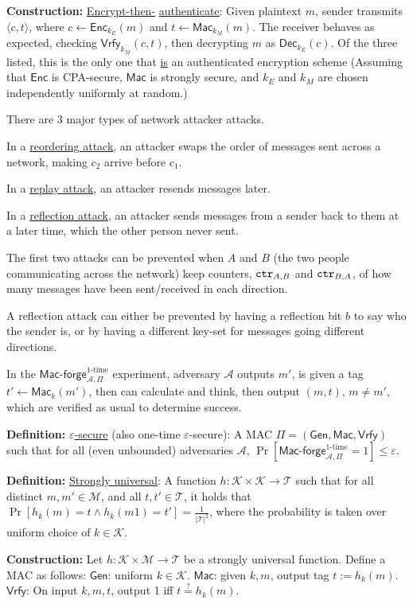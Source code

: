 \documentclass[10pt]{article}
\newcommand{\AAA}{\mathcal{A}}
\newcommand{\KKK}{\mathcal{K}}
\newcommand{\MMM}{\mathcal{M}}
\newcommand{\TTT}{\mathcal{T}}
\newcommand{\defn}[1]{{\bf Definition:} \underline{#1}}
\newcommand{\con}[1]{{\bf Construction:} \underline{#1}}
\newcommand{\Enc}{\mathsf{Enc}}
\newcommand{\Dec}{\mathsf{Dec}}
\newcommand{\Mac}{\mathsf{Mac}}
\newcommand{\Macf}{\mathsf{Mac\text{-}forge}}
\newcommand{\Vrfy}{\mathsf{Vrfy}}
\newcommand{\Gen}{\mathsf{Gen}}
\newcommand{\ang}[1]{\langle#1\rangle}
\newcommand{\GenMacVrfy}{(\Gen,\Mac,\Vrfy)}
\newcommand{\ctr}{{\tt ctr}}
\newcommand{\from}{\leftarrow}
\begin{document}
\begin{multicols}{3}
\con{Encrypt-then-} \underline{authenticate}: Given plaintext $m$, sender transmits $\ang{c,t}$, where $c\from\Enc_{k_E}(m)$ and $t\from\Mac_{k_M}(m)$. The receiver behaves as expected, checking $\Vrfy_{k_M}(c,t)$, then decrypting $m$ as $\Dec_{k_E}(c)$. Of the three listed, this is the only one that \underline{is} an authenticated encryption scheme (Assuming that $\Enc$ is CPA-secure, $\Mac$ is strongly secure, and $k_E$ and $k_M$ are chosen independently uniformly at random.)

There are 3 major types of network attacker attacks.

In a \underline{reordering attack}, an attacker swaps the order of messages sent across a network, making $c_2$ arrive before $c_1$.

In a \underline{replay attack}, an attacker resends messages later.

In a \underline{reflection attack}, an attacker sends messages from a sender back to them at a later time, which the other person never sent.

The first two attacks can be prevented when $A$ and $B$ (the two people communicating across the network) keep counters, $\ctr_{A,B}$ and $\ctr_{B,A}$, of how many messages have been sent/received in each direction.

A reflection attack can either be prevented by having a reflection bit $b$ to say who the sender is, or by having a different key-set for messages going different directions.

In the $\Macf_{\AAA,\Pi}^{\text{1-time}}$ experiment, adversary $\AAA$ outputs $m'$, is given a tag $t'\from\Mac_k(m')$, then can calculate and think, then output $(m,t)$, $m\neq m'$, which are verified as usual to determine success.

\defn{$\varepsilon$-secure} (also one-time $\varepsilon$-secure): A MAC $\Pi=\GenMacVrfy$ such that for all (even unbounded) adversaries $\AAA$, $\Pr[\Macf_{\AAA,\Pi}^{\text{1-time}}=1]\leq\varepsilon$.

\defn{Strongly universal}: A function $h:\KKK\times\KKK\to\TTT$ such that for all distinct $m,m'\in\MMM$, and all $t,t'\in\TTT$, it holds that $\Pr[h_k(m)=t\wedge h_k(m1)=t']=\frac{1}{|\TTT|^2}$, where the probability is taken over uniform choice of $k\in\KKK$.

\con{}Let $h:\KKK\times\MMM\to\TTT$ be a strongly universal function. Define a MAC as follows: $\Gen$: uniform $k\in\KKK$. $\Mac$: given $k,m$, output tag $t:=h_k(m)$. $\Vrfy$: On input $k,m,t$, output 1 iff $t\overset{?}{=}h_k(m)$.


\end{multicols}
\end{document}
